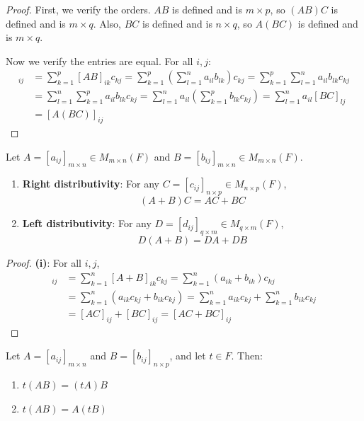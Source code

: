 \begin{proof}
    First, we verify the orders. $AB$ is defined and is $m \times p$, so $(AB)C$ is defined and is $m \times q$. Also, $BC$ is defined and is $n \times q$, so $A(BC)$ is defined and is $m \times q$.
    
    Now we verify the entries are equal. For all $i,j$:
    \begin{align*}
    [(AB)C]_{ij} &= \sum_{k=1}^{p} [AB]_{ik} c_{kj} = \sum_{k=1}^{p} \left(\sum_{l=1}^{n} a_{il}b_{lk}\right) c_{kj} = \sum_{k=1}^{p} \sum_{l=1}^{n} a_{il}b_{lk}c_{kj} \\
    &= \sum_{l=1}^{n} \sum_{k=1}^{p} a_{il}b_{lk}c_{kj} = \sum_{l=1}^{n} a_{il} \left(\sum_{k=1}^{p} b_{lk}c_{kj}\right) = \sum_{l=1}^{n} a_{il}[BC]_{lj} \\
    &= [A(BC)]_{ij}
    \end{align*}
\end{proof}

\begin{theorem}\label{thm:matrix-mult-distrib}
    Let $A = [a_{ij}]_{m \times n} \in M_{m \times n}(F)$ and $B = [b_{ij}]_{m \times n} \in M_{m \times n}(F)$.
    \begin{enumerate}[label=(\roman*)]
        \item \textbf{Right distributivity}: For any $C = [c_{ij}]_{n \times p} \in M_{n \times p}(F)$,
        \[
        (A + B)C = AC + BC
        \]
        \item \textbf{Left distributivity}: For any $D = [d_{ij}]_{q \times m} \in M_{q \times m}(F)$,
        \[
        D(A + B) = DA + DB
        \]
    \end{enumerate}
\end{theorem}

\begin{proof}
    \textbf{(i)}: For all $i,j$,
    \begin{align*}
    [(A+B)C]_{ij} &= \sum_{k=1}^{n} [A+B]_{ik}c_{kj} = \sum_{k=1}^{n} (a_{ik} + b_{ik})c_{kj} \\
    &= \sum_{k=1}^{n} (a_{ik}c_{kj} + b_{ik}c_{kj}) = \sum_{k=1}^{n} a_{ik}c_{kj} + \sum_{k=1}^{n} b_{ik}c_{kj} \\
    &= [AC]_{ij} + [BC]_{ij} = [AC + BC]_{ij}
    \end{align*}
    
\end{proof}

\begin{proposition}\label{prop:scalar-factoring}
    Let $A = [a_{ij}]_{m \times n}$ and $B = [b_{ij}]_{n \times p}$, and let $t \in F$. Then:
    \begin{enumerate}[label=(\roman*)]
        \item $t(AB) = (tA)B$
        \item $t(AB) = A(tB)$
    \end{enumerate}
\end{proposition}

